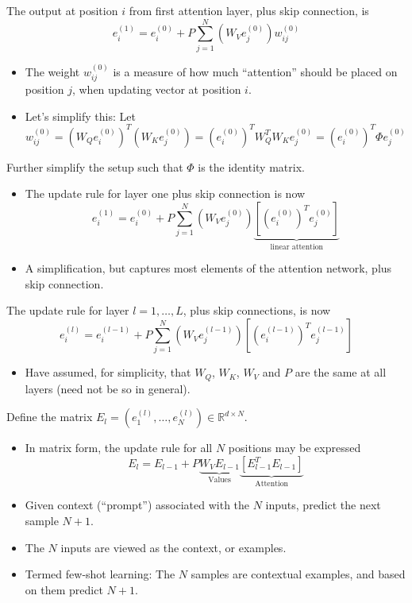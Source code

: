 \documentclass[12pt]{extarticle}
\begin{document}
\newpage
The output at position $i$ from first attention layer, plus skip connection, is
\[
e_i^{(1)} = e_i^{(0)} + P \sum_{j=1}^{N} (W_V e_j^{(0)}) w_{ij}^{(0)}
\]

\begin{itemize}
    \item The weight $w_{ij}^{(0)}$ is a measure of how much ``attention'' should be placed on position $j$, when updating vector at position $i$.
    
    \item Let's simplify this: Let
    \[
    w_{ij}^{(0)} = (W_Q e_i^{(0)})^T (W_K e_j^{(0)}) = (e_i^{(0)})^T W_Q^T W_K e_j^{(0)} = (e_i^{(0)})^T \Phi e_j^{(0)}
    \]
\end{itemize}

Further simplify the setup such that $\Phi$ is the identity matrix.

\begin{itemize}
    \item The update rule for layer one plus skip connection is now
    \[
    e_i^{(1)} = e_i^{(0)} + P \sum_{j=1}^{N} (W_V e_j^{(0)}) \underbrace{\left[(e_i^{(0)})^T e_j^{(0)}\right]}_{\text{linear attention}}
    \]
    
    \item A simplification, but captures most elements of the attention network, plus skip connection.
\end{itemize}

The update rule for layer $l = 1, \ldots, L$, plus skip connections, is now
\[
e_i^{(l)} = e_i^{(l-1)} + P \sum_{j=1}^{N} (W_V e_j^{(l-1)}) \left[(e_i^{(l-1)})^T e_j^{(l-1)}\right]
\]

\begin{itemize}
    \item Have assumed, for simplicity, that $W_Q$, $W_K$, $W_V$ and $P$ are the same at all layers (need not be so in general).
\end{itemize}

Define the matrix $E_l = (e_1^{(l)}, \ldots, e_N^{(l)}) \in \mathbb{R}^{d \times N}$.

\begin{itemize}
    \item In matrix form, the update rule for all $N$ positions may be expressed
    \[
    E_l = E_{l-1} + P \underbrace{W_V E_{l-1}}_{\text{Values}} \underbrace{[E_{l-1}^T E_{l-1}]}_{\text{Attention}}
    \]
    
    \item Given context (``prompt'') associated with the $N$ inputs, predict the next sample $N+1$.
    
    \item The $N$ inputs are viewed as the context, or examples.
    
    \item Termed few-shot learning: The $N$ samples are contextual examples, and based on them predict $N+1$.
\end{itemize}
\end{document}

